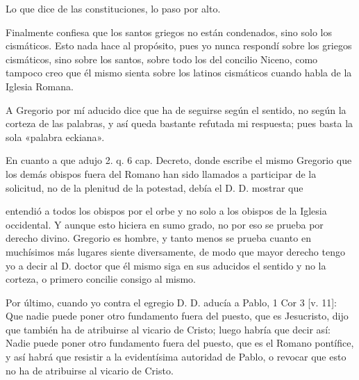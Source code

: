 Lo que dice de las constituciones, lo paso por alto.

Finalmente confiesa que los santos griegos no están condenados, sino solo los cismáticos. Esto nada hace al propósito, pues yo nunca respondí sobre los griegos cismáticos, sino sobre los santos, sobre todo los del concilio Niceno, como tampoco creo que él mismo sienta sobre los latinos cismáticos cuando habla de la Iglesia Romana.

A Gregorio por mí aducido dice que ha de seguirse según el sentido, no según la corteza de las palabras, y así queda bastante refutada mi respuesta; pues basta la sola «palabra eckiana».

En cuanto a que adujo 2. q. 6 cap. Decreto, donde escribe el mismo Gregorio que los demás obispos fuera del Romano han sido llamados a participar de la solicitud, no de la plenitud de la potestad, debía el D. D. mostrar que

entendió a todos los obispos por el orbe y no solo a los obispos de la Iglesia occidental. Y aunque esto hiciera en sumo grado, no por eso se prueba por derecho divino. Gregorio es hombre, y tanto menos se prueba cuanto en muchísimos más lugares siente diversamente, de modo que mayor derecho tengo yo a decir al D. doctor que él mismo siga en sus aducidos el sentido y no la corteza, o primero concilie consigo al mismo.

Por último, cuando yo contra el egregio D. D. aducía a Pablo, 1 Cor 3 [v. 11]: Que nadie puede poner otro fundamento fuera del puesto, que es Jesucristo, dijo que también ha de atribuirse al vicario de Cristo; luego habría que decir así: Nadie puede poner otro fundamento fuera del puesto, que es el Romano pontífice, y así habrá que resistir a la evidentísima autoridad de Pablo, o revocar que esto no ha de atribuirse al vicario de Cristo.

